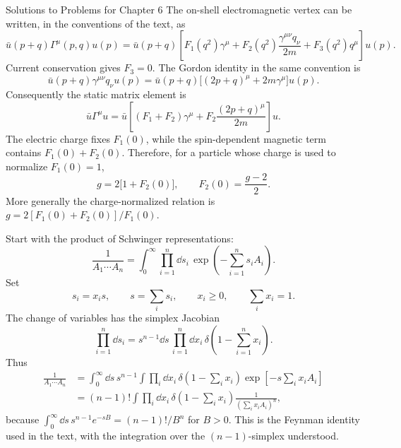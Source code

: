 \begin{bankssolutions}{Solutions to Problems for Chapter 6}
The on-shell electromagnetic vertex can be written, in the conventions of
the text, as
\begin{equation*}
 \bar u(p+q)\Gamma^\mu(p,q)u(p)
 =\bar u(p+q)\left[F_1(q^2)\gamma^\mu
 +F_2(q^2)\frac{\gamma^{\mu\nu}q_\nu}{2m}
 +F_3(q^2)q^\mu\right]u(p).
\end{equation*}
Current conservation gives $F_3=0$.  The Gordon identity in the same
convention is
\[
 \bar u(p+q)\gamma^{\mu\nu}q_\nu u(p)
 =\bar u(p+q)\bigl[(2p+q)^\mu+2m\gamma^\mu\bigr]u(p).
\]
Consequently the static matrix element is
\begin{equation*}
 \bar u\Gamma^\mu u
 =\bar u\left[(F_1+F_2)\gamma^\mu
 +F_2\frac{(2p+q)^\mu}{2m}\right]u.
\end{equation*}
The electric charge fixes $F_1(0)$, while the spin-dependent magnetic term
contains $F_1(0)+F_2(0)$.  Therefore, for a particle whose charge is used
to normalize $F_1(0)=1$,
\begin{equation*}
 g=2\bigl[1+F_2(0)\bigr],
 \qquad
 F_2(0)=\frac{g-2}{2}.
\end{equation*}
More generally the charge-normalized relation is
$g=2[F_1(0)+F_2(0)]/F_1(0)$.

Start with the product of Schwinger representations:
\[
 \frac1{A_1\cdots A_n}
 =\int_{0}^{\infty}\prod_{i=1}^{n}\dd s_i\,
 \exp\left(-\sum_{i=1}^{n}s_iA_i\right).
\]
Set
\[
 s_i=x_i s,\qquad s=\sum_i s_i,
 \qquad x_i\geq0,\qquad \sum_i x_i=1.
\]
The change of variables has the simplex Jacobian
\[
 \prod_{i=1}^{n}\dd s_i
 =s^{n-1}\dd s\,\prod_{i=1}^{n}\dd x_i\,
 \delta\!\left(1-\sum_{i=1}^{n}x_i\right).
\]
Thus
\begin{align*}
 \frac1{A_1\cdots A_n}
 &=\int_0^\infty\dd s\,s^{n-1}
 \int\prod_i\dd x_i\,\delta\!\left(1-\sum_i x_i\right)
 \exp\left[-s\sum_i x_iA_i\right]\\
 &=(n-1)!\int\prod_i\dd x_i\,
 \delta\!\left(1-\sum_i x_i\right)
 \frac1{\left(\sum_i x_iA_i\right)^n},
\end{align*}
because $\int_0^\infty\dd s\,s^{n-1}e^{-sB}=(n-1)!/B^n$ for $B>0$.
This is the Feynman identity used in the text, with the integration over
the $(n-1)$-simplex understood.


\end{bankssolutions}
